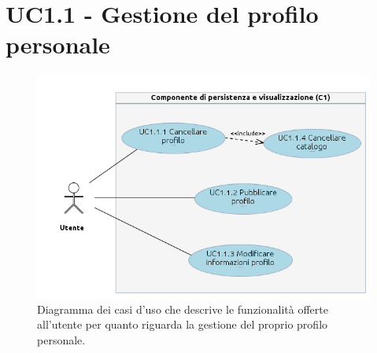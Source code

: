 \section{UC1.1 - Gestione del profilo personale}
\begin{figure}[h]
  \centering
  \includegraphics[width=14cm]{img/AR/UC1_1.png}
\caption{Diagramma dei casi d'uso che descrive le funzionalit\`a offerte
all'utente per quanto riguarda la gestione del proprio profilo personale.}
\end{figure}

